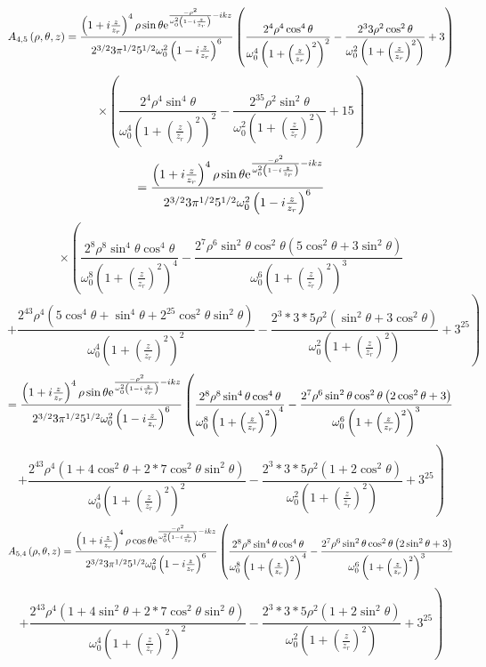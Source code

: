 \documentclass[11pt]{amsart}
\makeatletter
\newcommand{\e}{{\rm e}}				%
\newcommand{\0}{\varnothing}		%
\newcommand{\1}{!}
\newcommand{\2}{@}
\newcommand{\3}{\#}
\newcommand{\4}{\$}
\newcommand{\5}{\%}
\newcommand{\6}{$^\wedge$}
\newcommand{\7}{\&}
\newcommand{\8}{*}
\newcommand{\9}{(}
\makeatother
\begin{document}
\[
A_{4,5}\left(\rho,\theta,z\right) = \frac{\left(1+i\frac{z}{z_r}\right)^4\rho \sin \theta \e^{\frac{-\rho^2}{\omega_0^2\left(1-i\frac{z}{z_r}\right)}-ikz}}{2^{3/2}3\pi^{1/2}5^{1/2}\omega_0^2\left(1-i\frac{z}{z_r}\right)^6}\left(\frac{2^4\rho^4\cos^4\theta}{\omega_0^4\left(1+\left(\frac{z}{z_r}\right)^2\right)^2}-\frac{2^33\rho^2\cos^2\theta}{\omega_0^2\left(1+\left(\frac{z}{z_r}\right)^2\right)}+3\right)
\]
\[
\times \left(\frac{2^4\rho^4\sin^4\theta}{\omega_0^4\left(1+\left(\frac{z}{z_r}\right)^2\right)^2}-\frac{2^35\rho^2\sin^2\theta}{\omega_0^2\left(1+\left(\frac{z}{z_r}\right)^2\right)}+15\right)
\]
\[
=\frac{\left(1+i\frac{z}{z_r}\right)^4\rho \sin \theta \e^{\frac{-\rho^2}{\omega_0^2\left(1-i\frac{z}{z_r}\right)}-ikz}}{2^{3/2}3\pi^{1/2}5^{1/2}\omega_0^2\left(1-i\frac{z}{z_r}\right)^6}\]
\[
\times\left(\frac{2^8\rho^8\sin^4\theta \cos^4 \theta}{\omega_0^8\left(1+\left(\frac{z}{z_r}\right)^2\right)^4}-\frac{2^7\rho^6\sin^2\theta\cos^2\theta\left(5\cos^2\theta + 3\sin^2\theta\right)}{\omega_0^6\left(1+\left(\frac{z}{z_r}\right)^2\right)^3}\right.
\]
\[
\left.+\frac{2^43\rho^4\left(5\cos^4\theta+\sin^4\theta+2^25\cos^2\theta\sin^2\theta\right)}{\omega_0^4\left(1+\left(\frac{z}{z_r}\right)^2\right)^2} - \frac{2^3*3*5\rho^2\left(\sin^2\theta+3\cos^2\theta\right)}{\omega_0^2\left(1+\left(\frac{z}{z_r}\right)^2\right)}+3^25\right)
\]
\[
=\frac{\left(1+i\frac{z}{z_r}\right)^4\rho \sin \theta \e^{\frac{-\rho^2}{\omega_0^2\left(1-i\frac{z}{z_r}\right)}-ikz}}{2^{3/2}3\pi^{1/2}5^{1/2}\omega_0^2\left(1-i\frac{z}{z_r}\right)^6}
\left(\frac{2^8\rho^8\sin^4\theta \cos^4 \theta}{\omega_0^8\left(1+\left(\frac{z}{z_r}\right)^2\right)^4}-\frac{2^7\rho^6\sin^2\theta\cos^2\theta\left(2\cos^2\theta + 3\right)}{\omega_0^6\left(1+\left(\frac{z}{z_r}\right)^2\right)^3}\right.
\]
\[
\left.+\frac{2^43\rho^4\left(1+4\cos^2\theta+2*7\cos^2\theta\sin^2\theta\right)}{\omega_0^4\left(1+\left(\frac{z}{z_r}\right)^2\right)^2} - \frac{2^3*3*5\rho^2\left(1+2\cos^2\theta\right)}{\omega_0^2\left(1+\left(\frac{z}{z_r}\right)^2\right)}+3^25\right)
\]
\[
A_{5,4} \left(\rho,\theta,z\right) = \frac{\left(1+i\frac{z}{z_r}\right)^4\rho \cos \theta \e^{\frac{-\rho^2}{\omega_0^2\left(1-i\frac{z}{z_r}\right)}-ikz}}{2^{3/2}3\pi^{1/2}5^{1/2}\omega_0^2\left(1-i\frac{z}{z_r}\right)^6}
\left(\frac{2^8\rho^8\sin^4\theta \cos^4 \theta}{\omega_0^8\left(1+\left(\frac{z}{z_r}\right)^2\right)^4}-\frac{2^7\rho^6\sin^2\theta\cos^2\theta\left(2\sin^2\theta + 3\right)}{\omega_0^6\left(1+\left(\frac{z}{z_r}\right)^2\right)^3}\right.
\]
\[
\left.+\frac{2^43\rho^4\left(1+4\sin^2\theta+2*7\cos^2\theta\sin^2\theta\right)}{\omega_0^4\left(1+\left(\frac{z}{z_r}\right)^2\right)^2} - \frac{2^3*3*5\rho^2\left(1+2\sin^2\theta\right)}{\omega_0^2\left(1+\left(\frac{z}{z_r}\right)^2\right)}+3^25\right)
\]
\end{document}
